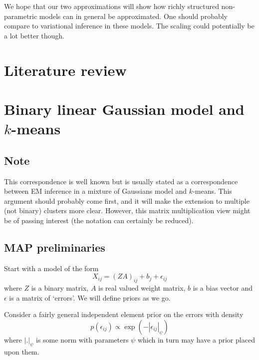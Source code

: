 \documentclass{article}
\numberwithin{equation}{section}
\numberwithin{thm}{section}
\def\IBP{Z}
\def\Weights{A}
\def\Data{X}
\def\errors{\epsilon}
\def\bias{b}
\begin{document}
We hope that our two approximations will show how richly structured non-parametric models can in general be approximated.
One should probably compare to \eg variational inference in these models.
The scaling could potentially be a lot better though.

\section{Literature review}


\cite{Griffiths2011}
\cite{Luxburg2007}
\cite{Cui2007}
\cite{Niu2010}
\cite{Niu2011}
\cite{Niu2012}
\cite{Qi2009}
\cite{Davidson2008}
\cite{Jain2008}

\section{Binary linear Gaussian model and $k$-means}

\subsection{Note}

This correspondence is well known but is usually stated as a correspondence between EM inference in a mixture of Gaussians model and $k$-means.
This argument should probably come first, and it will make the extension to multiple (\ie not binary) clusters more clear.
However, this matrix multiplication view might be of passing interest (the notation can certainly be reduced).

\subsection{MAP preliminaries}

Start with a model of the form
\begin{equation}
\Data_{ij} = (\IBP\Weights)_{ij} + \bias_{j} + \errors_{ij}
\end{equation}
where $\IBP$ is a binary matrix, $\Weights$ is real valued weight matrix, $\bias$ is a bias vector and $\epsilon$ is a matrix of `errors'.
We will define priors as we go.

Consider a fairly general independent element prior on the errors with density
\begin{equation}
p(\errors_{ij}) \propto \exp(-|\errors_{ij}|_\psi)
\end{equation}
where $|.|_{\psi}$ is some norm with parameters $\psi$ which in turn may have a prior placed upon them.
\end{document}
